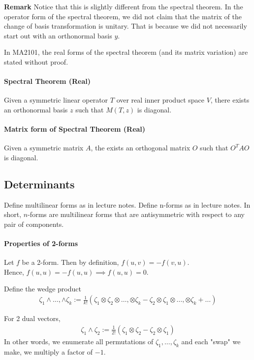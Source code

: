 \documentclass{article}
\begin{document}
\textbf{Remark} Notice that this is slightly different from the spectral theorem. In the operator form of the spectral theorem, we did not claim that the matrix of the change of basis transformation is unitary. That is because we did not necessarily start out with an orthonormal basis $y$.

In MA2101, the real forms of the spectral theorem (and its matrix variation) are stated without proof.

\paragraph{Spectral Theorem (Real)} Given a symmetric linear operator $T$ over real inner product space $V$, there exists an orthonormal basis $z$ such that $M(T,z)$ is diagonal.

\paragraph{Matrix form of Spectral Theorem (Real)} Given a symmetric matrix $A$, the exists an orthogonal matrix $O$ such that $O^TAO$ is diagonal.


\subsection{Determinants}
Define multilinear forms as in lecture notes.
Define n-forms as in lecture notes. In short, $n$-forms are multilinear forms that are antisymmetric with respect to any pair of components.

\paragraph{Properties of 2-forms}
Let $f$ be a 2-form. Then by definition, $f(u,v)=-f(v,u)$.\\
Hence, $f(u,u) = -f(u,u)\implies f(u,u)=0$.

Define the wedge product 
\begin{align*}
\zeta_1\wedge \dots, \wedge \zeta_k := \frac{1}{k!}(\zeta_1\otimes \zeta_2\otimes \dots, \otimes \zeta_k - \zeta_2\otimes \zeta_1\otimes \dots, \otimes \zeta_k + \dots)
\end{align*}

For 2 dual vectors, 
\begin{align*}
\zeta_1\wedge \zeta_2 := \frac{1}{2!}(\zeta_1\otimes \zeta_2 - \zeta_2 \otimes \zeta_1)
\end{align*}
In other words, we enumerate all permutations of $\zeta_1, \dots, \zeta_k$ and each "swap" we make, we multiply a factor of $-1$.
\end{document}
